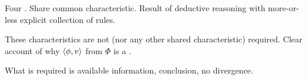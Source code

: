 




\begin{note}
  Four \illu{}.
  Share common characteristic.
  Result of deductive reasoning with more-or-less explicit collection of rules.

  These characteristics are not (nor any other shared characteristic) required.
  Clear account of why \(\langle \phi, v \rangle\) from \(\Phi\) is a \fc{}.

  What is required is available information, conclusion, no divergence.
\end{note}


